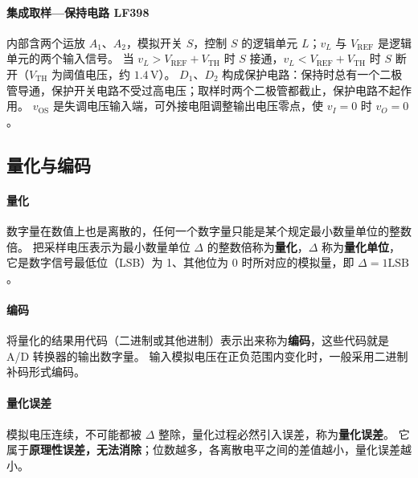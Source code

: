\paragraph{集成取样—保持电路 LF398}
内部含两个运放 $A_1$、$A_2$，模拟开关 $S$，控制 $S$ 的逻辑单元 $L$；$v_L$ 与 $V_\text{REF}$ 是逻辑单元的两个输入信号。
当 $v_L>V_\text{REF}+V_\text{TH}$ 时 $S$ 接通，$v_L<V_\text{REF}+V_\text{TH}$ 时 $S$ 断开（$V_\text{TH}$ 为阈值电压，约 $1.4\,\mathrm{V}$）。
$D_1$、$D_2$ 构成保护电路：保持时总有一个二极管导通，保护开关电路不受过高电压；取样时两个二极管都截止，保护电路不起作用。
$v_\text{OS}$ 是失调电压输入端，可外接电阻调整输出电压零点，使 $v_I=0$ 时 $v_O=0$。

\subsection{量化与编码}
\paragraph{量化}
数字量在数值上也是离散的，任何一个数字量只能是某个规定最小数量单位的整数倍。
把采样电压表示为最小数量单位 $\Delta$ 的整数倍称为\textbf{量化}，$\Delta$ 称为\textbf{量化单位}，
它是数字信号最低位（LSB）为 1、其他位为 0 时所对应的模拟量，即 $\Delta=1\text{LSB}$。

\paragraph{编码}
将量化的结果用代码（二进制或其他进制）表示出来称为\textbf{编码}，这些代码就是 A/D 转换器的输出数字量。
输入模拟电压在正负范围内变化时，一般采用二进制补码形式编码。

\paragraph{量化误差}
模拟电压连续，不可能都被 $\Delta$ 整除，量化过程必然引入误差，称为\textbf{量化误差}。
它属于\textbf{原理性误差，无法消除}；位数越多，各离散电平之间的差值越小，量化误差越小。


